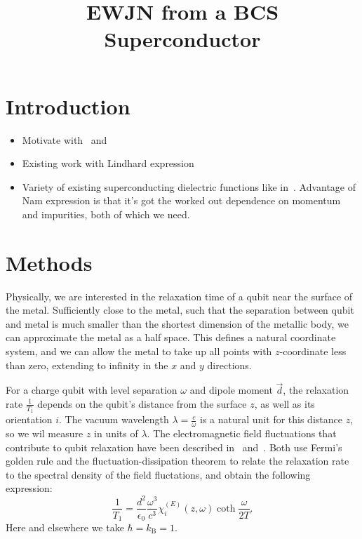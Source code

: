 \documentclass{article}
\title{EWJN from a BCS Superconductor}
\begin{document}
\maketitle

\section{Introduction \label{sec:intro}}
\begin{itemize}
	\item Motivate with~\cite{Tenberg2019} and~\cite{Kolkowitz2015}
	\item Existing work with Lindhard expression~\cite{QubitRelax}
	\item Variety of existing superconducting dielectric functions like in~\cite{AGD, llv9, Zimmermann1991, Mattis, Tinkham}.
	Advantage of Nam expression\cite{Nam1967} is that it's got the worked out dependence on momentum and impurities, both of which we need.
\end{itemize}
\section{Methods \label{sec:methods}}

Physically, we are interested in the relaxation time of a qubit near the surface of the metal.
Sufficiently close to the metal, such that the separation between qubit and metal is much smaller than the shortest dimension of the metallic body, we can approximate the metal as a half space.
This defines a natural coordinate system, and we can allow the metal to take up all points with $z$-coordinate less than zero, extending to infinity in the $x$ and $y$ directions.

For a charge qubit with level separation $\omega$ and dipole moment $\vec{d}$, the relaxation rate $\frac{1}{T_1}$ depends on the qubit's distance from the surface $z$, as well as its orientation $i$.
The vacuum wavelength $\lambda = \frac{c}{\omega}$ is a natural unit for this distance $z$, so we wil measure $z$ in units of $\lambda$.
The electromagnetic field fluctuations that contribute to qubit relaxation have been described in~\cite{QubitRelax} and~\cite{Henkel1999}.
Both use Fermi's golden rule and the fluctuation-dissipation theorem to relate the relaxation rate to the spectral density of the field fluctations, and obtain the following expression:
\begin{equation}
	\frac{1}{T_1} = \frac{d^2}{\epsilon_0} \frac{\omega^3}{c^3} \chi_{i}^{(E)}(z, \omega) \coth\frac{\omega}{2 T}.
\end{equation}
Here and elsewhere we take $\hbar = k_{\mathrm{B}} = 1$.
\end{document}
